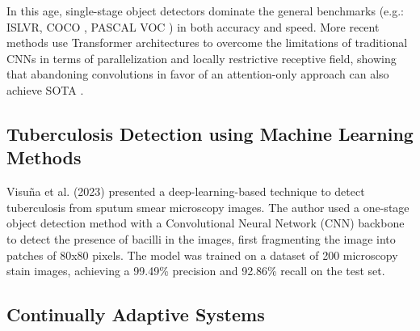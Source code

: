\documentclass[../main.tex]{subfiles}
\begin{document}
     In this age, single-stage object detectors dominate the general benchmarks (e.g.: ISLVR, COCO \cite{linMicrosoftCOCOCommon2015}, PASCAL VOC \cite{everinghamPascalVisualObject2010}) in both accuracy and speed. More recent methods use Transformer architectures \cite{vaswaniAttentionAllYou2017} to overcome the limitations of traditional CNNs in terms of parallelization and locally restrictive receptive field, showing that abandoning convolutions in favor of an attention-only approach can also achieve SOTA \cite{ carionEndtoEndObjectDetection2020,zhuDeformableDETRDeformable2021}.
    
    \subsection{Tuberculosis Detection using Machine Learning Methods} \label{sec:ml_tuberculosis_detection} 

    Visuña et al. (2023) \cite{visuna_novel_2023} presented a deep-learning-based technique to detect tuberculosis from sputum smear microscopy images. The author used a one-stage object detection method with a Convolutional Neural Network (CNN) backbone to detect the presence of bacilli in the images, first fragmenting the image into patches of 80x80 pixels. The model was trained on a dataset of 200 microscopy stain images, achieving a 99.49\% precision and 92.86\% recall on the test set. 
    
    \subsection{Continually Adaptive Systems} \label{sec:continually_adaptive_systems_sota} 

    
\end{document}
